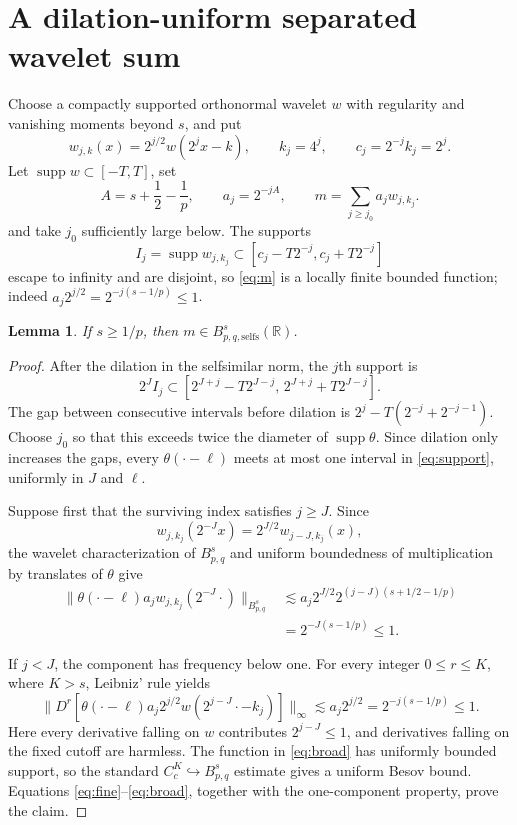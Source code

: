 \documentclass[9pt]{extarticle}
\newtheorem{lemma}[theorem]{Lemma}
\newcommand{\R}{\mathbb R}
\newcommand{\supp}{\operatorname{supp}}
\newcommand{\selfs}{\mathrm{selfs}}
\begin{document}
\section{A dilation-uniform separated wavelet sum}

Choose a compactly supported orthonormal wavelet $w$ with regularity and
vanishing moments beyond $s$, and put
\[
 w_{j,k}(x)=2^{j/2}w(2^jx-k),\qquad
 k_j=4^j,\qquad c_j=2^{-j}k_j=2^j.
\]
Let $\supp w\subset[-T,T]$, set
\begin{equation}\label{eq:m}
 A=s+\frac12-\frac1p,\qquad a_j=2^{-jA},
 \qquad m=\sum_{j\geq j_0}a_jw_{j,k_j}.
\end{equation}
and take $j_0$ sufficiently large below.  The supports
\[
 I_j=\supp w_{j,k_j}\subset
 [c_j-T2^{-j},c_j+T2^{-j}]
\]
escape to infinity and are disjoint, so \eqref{eq:m} is a locally finite bounded
function; indeed $a_j2^{j/2}=2^{-j(s-1/p)}\leq1$.

\begin{lemma}\label{lem:selfs}
If $s\geq1/p$, then $m\in B^s_{p,q,\selfs}(\R)$.
\end{lemma}

\begin{proof}
After the dilation in the selfsimilar norm, the $j$th support is
\begin{equation}\label{eq:support}
 2^JI_j\subset
 [2^{J+j}-T2^{J-j},\,2^{J+j}+T2^{J-j}].
\end{equation}
The gap between consecutive intervals before dilation is
$2^j-T(2^{-j}+2^{-j-1})$.  Choose $j_0$ so that this exceeds twice the
diameter of $\supp\theta$.  Since dilation only increases the gaps, every
$\theta(\cdot-\ell)$ meets at most one interval in \eqref{eq:support}, uniformly in
$J$ and $\ell$.

Suppose first that the surviving index satisfies $j\geq J$.  Since
\[
 w_{j,k_j}(2^{-J}x)=2^{J/2}w_{j-J,k_j}(x),
\]
the wavelet characterization of $B^s_{p,q}$ and uniform boundedness of
multiplication by translates of $\theta$ give
\begin{align}
 \|\theta(\cdot-\ell)a_jw_{j,k_j}(2^{-J}\cdot)\|_{B^s_{p,q}}
 &\lesssim a_j2^{J/2}2^{(j-J)(s+1/2-1/p)}\\
 &=2^{-J(s-1/p)}\leq1. \label{eq:fine}
\end{align}

If $j<J$, the component has frequency below one.  For every integer
$0\leq r\leq K$, where $K>s$, Leibniz' rule yields
\begin{equation}\label{eq:broad}
 \big\|D^r[\theta(\cdot-\ell)a_j2^{j/2}
 w(2^{j-J}\cdot-k_j)]\big\|_\infty
 \lesssim a_j2^{j/2}=2^{-j(s-1/p)}\leq1.
\end{equation}
Here every derivative falling on $w$ contributes
$2^{j-J}\leq1$, and derivatives falling on the fixed cutoff are harmless.
The function in \eqref{eq:broad} has uniformly bounded support, so the standard
$C_c^K\hookrightarrow B^s_{p,q}$ estimate gives a uniform Besov bound.
Equations \eqref{eq:fine}--\eqref{eq:broad}, together with the
one-component property, prove the
claim.
\end{proof}
\end{document}
